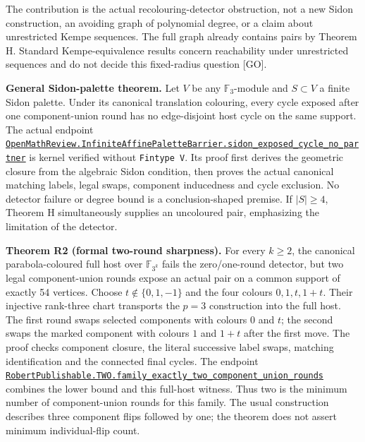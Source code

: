 \documentclass[
  11pt,
]{article}
\begin{document}
The contribution is the actual recolouring-detector obstruction, not a
new Sidon construction, an avoiding graph of polynomial degree, or a
claim about unrestricted Kempe sequences. The full graph already
contains pairs by Theorem H. Standard Kempe-equivalence results concern
reachability under unrestricted sequences and do not decide this
fixed-radius question {[}GO{]}.

\textbf{General Sidon-palette theorem.} Let \(V\) be any
\(\mathbb F_3\)-module and \(S\subset V\) a finite Sidon palette. Under
its canonical translation colouring, every cycle exposed after one
component-union round has no edge-disjoint host cycle on the same
support. The actual endpoint
\href{https://github.com/alejandrozu/openmath-2026-judging/blob/70c5ec3107658182f22c207d4c50f53f9cb3e602/robert-review-2026-10-07/lean/InfiniteAffinePaletteBarrier.lean\#L54}{\texttt{OpenMathReview.InfiniteAffinePaletteBarrier.sidon\_exposed\_cycle\_no\_partner}}
is kernel verified without \texttt{Fintype\ V}. Its proof first derives
the geometric closure from the algebraic Sidon condition, then proves
the actual canonical matching labels, legal swaps, component inducedness
and cycle exclusion. No detector failure or degree bound is a
conclusion-shaped premise. If \(|S|\geq4\), Theorem H simultaneously
supplies an uncoloured pair, emphasizing the limitation of the detector.

\textbf{Theorem R2 (formal two-round sharpness).} For every \(k\geq2\),
the canonical parabola-coloured full host over \(\mathbb F_{3^k}\) fails
the zero/one-round detector, but two legal component-union rounds expose
an actual pair on a common support of exactly 54 vertices. Choose
\(t\notin\{0,1,-1\}\) and the four colours \(0,1,t,1+t\). Their
injective rank-three chart transports the \(p=3\) construction into the
full host. The first round swaps selected components with colours \(0\)
and \(t\); the second swaps the marked component with colours \(1\) and
\(1+t\) after the first move. The proof checks component closure, the
literal successive label swaps, matching identification and the
connected final cycles. The endpoint
\href{https://github.com/alejandrozu/openmath-2026-judging/blob/70c5ec3107658182f22c207d4c50f53f9cb3e602/robert-review-2026-10-07/lean/CycleComposition.lean\#L171}{\texttt{RobertPublishable.TWO.family\_exactly\_two\_component\_union\_rounds}}
combines the lower bound and this full-host witness. Thus two is the
minimum number of component-union rounds for this family. The usual
construction describes three component flips followed by one; the
theorem does not assert minimum individual-flip count.
\end{document}
